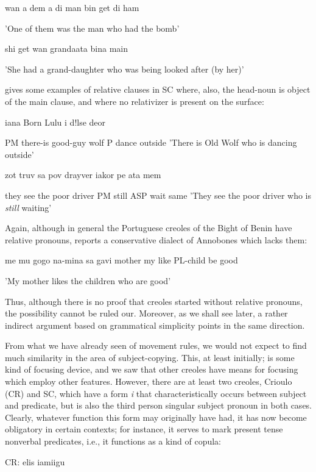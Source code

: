 \ea\label{ex:39}
 wan a dem a di man bin get di ham
\glt
\z

'One of them was the man who had the bomb'

\ea\label{ex:40}
 shi get wan grandaata bina main
\glt
\z

'She had a grand-daughter who was being looked after (by her)'

\citet[38]{Corne1977} gives some examples of relative clauses in SC where, also, the head-noun is object of the main clause, and where no rela\-tivizer is present on the surface:

\ea\label{ex:41}
 iana Born Lulu i d!lse deor
\glt
\z

PM there-is good-guy wolf P dance outside 'There is Old Wolf who is dancing outside'

\ea\label{ex:42}
 zot truv sa pov drayver iakor pe ata mem
\glt
\z

they see the poor driver PM still ASP wait same 'They see the poor driver who is \textit{still} waiting'

Again, although in general the Portuguese creoles of the Bight of Benin have relative pronouns, \citet[97]{Valkoff1966} reports a conserva\-tive dialect of Annobones which lacks them:

\ea\label{ex:43}
 me mu gogo na-mina sa gavi mother my like PL-child be good
\glt
\z

'My mother likes the children who are good'

Thus, although there is no proof that creoles started without relative pronouns, the possibility cannot be ruled our. Moreover, as we shall see later, a rather indirect argument based on grammatical sim\-plicity points in the same direction.

From what we have already seen of movement rules, we would not expect to find much similarity in the area of subject-copying. This, at least initially; is some kind of focusing device, and we saw that other creoles have means for focusing which employ other features. However, there are at least two creoles, Crioulo (CR) and SC, which have a form \textit{i} that characteristically occurs between subject and predicate, but is also the third person singular subject pronoun in both cases. Clearly, what\-ever function this form may originally have had, it has now become obligatory in certain contexts; for instance, it serves to mark present tense nonverbal predicates, i.e., it functions as a kind of copula:

\ea\label{ex:44}
 CR: elis iamiigu
\glt
\z

